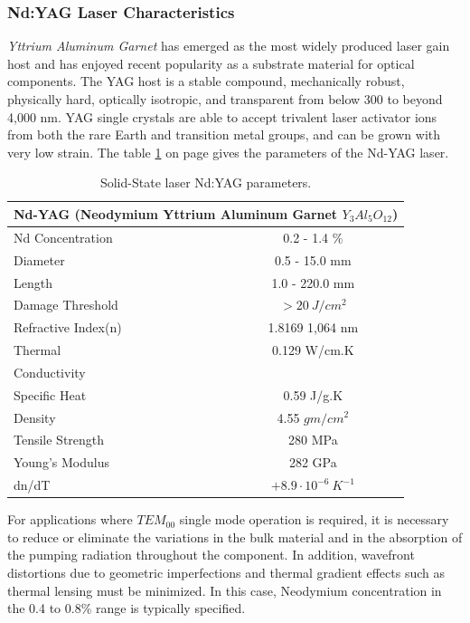 \subsubsection{Nd:YAG Laser Characteristics}
\label{nd_yag}
\textit{Yttrium Aluminum Garnet} has emerged as the most widely produced laser gain host and has enjoyed recent popularity as a substrate material for optical components. The YAG host is a stable compound, mechanically robust, physically hard, optically isotropic, and transparent from below 300 to beyond 4,000 nm. YAG single crystals are able to accept trivalent laser activator ions from both the rare Earth and transition metal groups, and can be grown with very low strain. The table \ref{tab:ndyag_parameters} on page \pageref{tab:ndyag_parameters} gives the parameters of the Nd-YAG laser.

\begin{table}[ht!]
\centering
\begin{tabular}{|l|c|}
\hline
  \multicolumn{2}{|c|}{Nd-YAG (Neodymium Yttrium Aluminum Garnet $Y_3Al_5O_{12}$)}\\\hline
  Nd Concentration & 0.2 - 1.4 \% \\
  Diameter & 0.5 - 15.0 mm \\
  Length & 1.0 - 220.0 mm \\
  Damage Threshold & $> 20\ J/cm^2$  \\
  Refractive Index(n) & 1.8169 \@ 1,064 nm \\
  Thermal & 0.129 W/cm.K \\
  Conductivity & \\
  Specific Heat & 0.59 J/g.K\\
  Density & 4.55 $gm/cm^2$\\
  Tensile Strength & 280 MPa \\
  Young's Modulus & 282 GPa\\
  dn/dT & $+8.9\cdot10^{-6}\ K^{-1}$\\\hline
\end{tabular}
\caption{Solid-State laser Nd:YAG parameters.}
\label{tab:ndyag_parameters}
\end{table}

For applications where $TEM_{00}$ single mode operation is required, it is necessary to reduce or eliminate the variations in the bulk material and in the absorption of the pumping radiation throughout the component. In addition, wavefront distortions due to geometric imperfections and thermal gradient effects such as thermal lensing must be minimized. In this case, Neodymium concentration in the 0.4 to 0.8\% range is typically specified.

